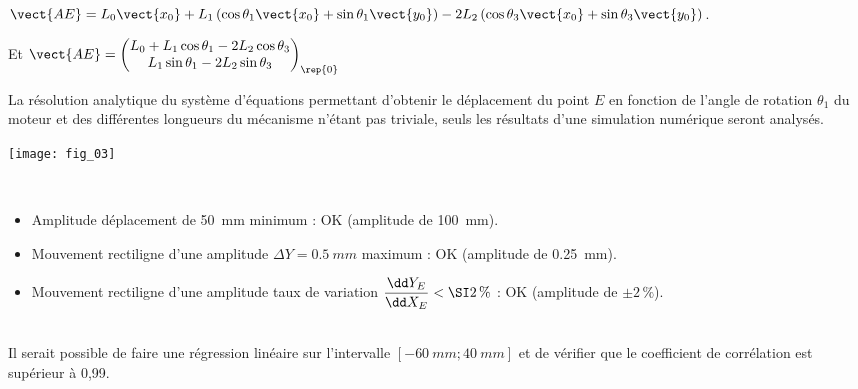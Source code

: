 \begin{multicols}{2}
\begin{multicols}{2}
\begin{corrige}
  $\vect{AE}=L_0\vect{x_0}+L_1\left( \cos \theta_1 \vect{x_0}+ \sin \theta_1 \vect{y_0} \right)-2L_2\left( \cos \theta_3\vect{x_0} + \sin \theta_3\vect{y_0}  \right)$. 
  
  Et $\vect{AE}=\begin{pmatrix} 
    L_0+L_1 \cos \theta_1 -2L_2\cos \theta_3 \\    
    L_1 \sin \theta_1 -2L_2 \sin \theta_3
  \end{pmatrix}_{\rep{0}}$
 
\end{corrige}
\else
\fi

\ifprof
\else

La résolution analytique du système d’équations permettant d’obtenir le déplacement du
point $E$ en fonction de l’angle de rotation $\theta_1$ du moteur et des différentes longueurs du mécanisme
n’étant pas triviale, seuls les résultats d’une simulation numérique seront analysés.

\begin{center}
\texttt{[image: fig\_03]}
\end{center}
\fi


\ifprof
\begin{corrige}~\\
\begin{itemize}
\item Amplitude déplacement de \SI{50}{mm} minimum : OK (amplitude de \SI{100}{mm}).
\item Mouvement rectiligne d'une amplitude $\Delta Y= \SI{0,5}{mm}$ maximum : OK (amplitude de \SI{0,25}{mm}).
\item Mouvement rectiligne d'une amplitude taux de variation $\dfrac{\dd Y_E}{\dd X_E}<\SI2\,\%$  : OK  (amplitude de $\pm 2\,\%$).
\end{itemize}
\end{corrige}
\else
\fi

\ifprof
\begin{corrige}~\\
Il serait possible de faire une régression linéaire sur l'intervalle $\left[-\SI{60}{mm}; \SI{40}{mm}\right]$ et de vérifier que le coefficient de corrélation est supérieur à 0,99.
\end{corrige}
\else
\fi


\end{multicols}
\end{multicols}

